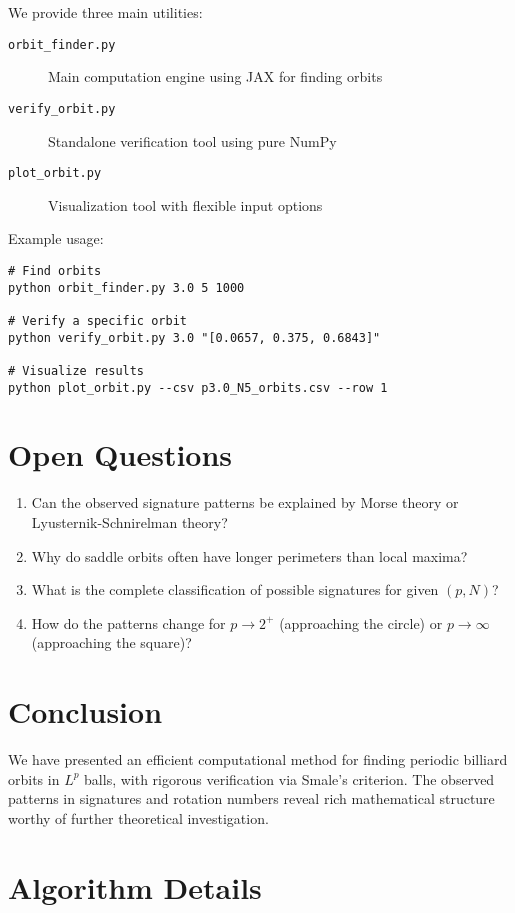 \documentclass[11pt]{amsart}
\theoremstyle{plain}
\theoremstyle{definition}
\theoremstyle{remark}
\begin{document}
We provide three main utilities:

\begin{description}
\item[\texttt{orbit\_finder.py}] Main computation engine using JAX\cite{jax2018github} for finding orbits
\item[\texttt{verify\_orbit.py}] Standalone verification tool using pure NumPy
\item[\texttt{plot\_orbit.py}] Visualization tool with flexible input options
\end{description}

Example usage:
\begin{verbatim}
# Find orbits
python orbit_finder.py 3.0 5 1000

# Verify a specific orbit
python verify_orbit.py 3.0 "[0.0657, 0.375, 0.6843]"

# Visualize results
python plot_orbit.py --csv p3.0_N5_orbits.csv --row 1
\end{verbatim}

\section{Open Questions}

\begin{enumerate}
\item Can the observed signature patterns be explained by Morse theory or Lyusternik-Schnirelman theory?
\item Why do saddle orbits often have longer perimeters than local maxima?
\item What is the complete classification of possible signatures for given $(p, N)$?
\item How do the patterns change for $p \to 2^+$ (approaching the circle) or $p \to \infty$ (approaching the square)?
\end{enumerate}

\section{Conclusion}

We have presented an efficient computational method for finding periodic billiard orbits in $L^p$ balls, with rigorous verification via Smale's criterion. The observed patterns in signatures and rotation numbers reveal rich mathematical structure worthy of further theoretical investigation.


\appendix

\section{Algorithm Details}
\end{document}
